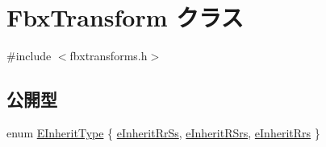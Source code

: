 \hypertarget{class_fbx_transform}{}\section{Fbx\+Transform クラス}
\label{class_fbx_transform}


{\ttfamily \#include $<$fbxtransforms.\+h$>$}

\subsection*{公開型}
\begin{DoxyCompactItemize}
\item 
enum \hyperlink{class_fbx_transform_ac1ab8f75b4873723daa68c57f999b10f}{E\+Inherit\+Type} \{ \hyperlink{class_fbx_transform_ac1ab8f75b4873723daa68c57f999b10fa0db9736825409edc03aa1f7a8a04eb09}{e\+Inherit\+Rr\+Ss}, 
\hyperlink{class_fbx_transform_ac1ab8f75b4873723daa68c57f999b10fa318c1b371c98ae5226e1559f7abaf493}{e\+Inherit\+R\+Srs}, 
\hyperlink{class_fbx_transform_ac1ab8f75b4873723daa68c57f999b10fa046d99ce2ae1163ebef1752203e802cb}{e\+Inherit\+Rrs}
 \}
\end{DoxyCompactItemize}
